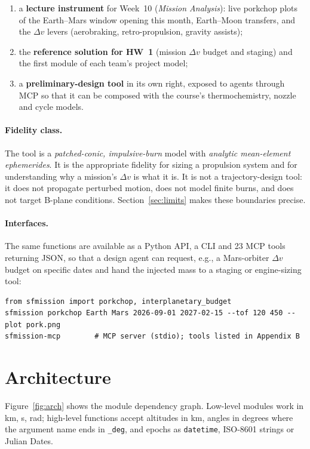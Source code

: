 \documentclass[11pt,a4paper]{article}
\newcommand{\dv}{\Delta v}
\newcommand{\code}[1]{\texttt{#1}}
\begin{document}
\begin{enumerate}[nosep]
\item a \textbf{lecture instrument} for Week~10 (\emph{Mission Analysis}): live porkchop
      plots of the Earth--Mars window opening this month, Earth--Moon transfers, and the
      $\dv$ levers (aerobraking, retro-propulsion, gravity assists);
\item the \textbf{reference solution for HW~1} (mission $\dv$ budget and staging) and the
      first module of each team's project model;
\item a \textbf{preliminary-design tool} in its own right, exposed to agents through MCP so
      that it can be composed with the course's thermochemistry, nozzle and cycle models.
\end{enumerate}

\paragraph{Fidelity class.} The tool is a \emph{patched-conic, impulsive-burn} model with
\emph{analytic mean-element ephemerides}. It is the appropriate fidelity for sizing a
propulsion system and for understanding why a mission's $\dv$ is what it is. It is not a
trajectory-design tool: it does not propagate perturbed motion, does not model finite burns,
and does not target B-plane conditions. Section~\ref{sec:limits} makes these boundaries precise.

\paragraph{Interfaces.} The same functions are available as a Python API, a CLI and 23 MCP
tools returning JSON, so that a design agent can request, e.g., a Mars-orbiter $\dv$ budget on
specific dates and hand the injected mass to a staging or engine-sizing tool:
\begin{lstlisting}
from sfmission import porkchop, interplanetary_budget
sfmission porkchop Earth Mars 2026-09-01 2027-02-15 --tof 120 450 --plot pork.png
sfmission-mcp        # MCP server (stdio); tools listed in Appendix B
\end{lstlisting}

\section{Architecture}
Figure~\ref{fig:arch} shows the module dependency graph. Low-level modules work in
\si{km}, \si{s}, \si{rad}; high-level functions accept altitudes in \si{km}, angles in degrees
where the argument name ends in \code{\_deg}, and epochs as \code{datetime}, ISO-8601 strings
or Julian Dates.
\end{document}
